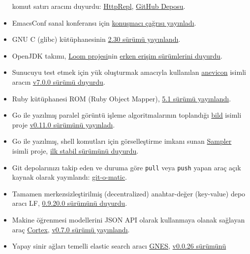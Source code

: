\documentclass[11pt]{article}
\begin{document}
\begin{itemize}
komut satırı aracını duyurdu: \href{https://devblogs.microsoft.com/aspnet/httprepl-a-command-line-tool-for-interacting-with-restful-http-services/}{HttpRepl}, \href{https://github.com/aspnet/HttpRepl}{GitHub Deposu}.
\item EmacsConf sanal konferansı için \href{https://emacsconf.org/2019/cfp}{konuşmacı çağrısı yayınladı}.
\item GNU C (glibc) kütüphanesinin \href{https://lwn.net/Articles/795127/}{2.30 sürümü yayınlandı}.
\item OpenJDK takımı, \href{https://openjdk.java.net/projects/loom/}{Loom projesi}nin \href{https://mail.openjdk.java.net/pipermail/loom-dev/2019-July/000633.html}{erken erişim sürümlerini duyurdu}.
\item Sunucuyu test etmek için yük oluşturmak amacıyla kullanılan \href{https://github.com/Gymmasssorla/anevicon}{anevicon} isimli
aracın \href{https://github.com/Gymmasssorla/anevicon/releases/tag/v7.0.0}{v7.0.0 sürümü duyurdu}.
\item Ruby kütüphanesi ROM (Ruby Object Mapper), \href{https://rom-rb.org/blog/rom-5-1-released/}{5.1 sürümü yayınlandı}.
\item Go ile yazılmış paralel görüntü işleme algoritmalarının toplandığı \href{https://github.com/anthonynsimon/bild}{bild}
isimli proje \href{https://github.com/anthonynsimon/bild/releases/tag/0.11.0}{v0.11.0 sürümünü yayınladı}.
\item Go ile yazılmış, shell komutları için görselleştirme imkanı sunan \href{https://github.com/sqshq/sampler}{Sampler}
isimli proje, \href{https://github.com/sqshq/sampler/releases/tag/v1.0.0}{ilk stabil sürümünü duyurdu}.
\item Git depolarınızı takip eden ve duruma göre \texttt{pull} veya \texttt{push} yapan araç
açık kaynak olarak yayınlandı: \href{https://github.com/muesli/gitomatic}{git-o-matic}.
\item Tamamen merkezsizleştirilmiş (decentralized) anahtar-değer (key-value) depo
aracı LF, \href{https://github.com/zerotier/lf/releases/tag/0.9.20.0}{0.9.20.0 sürümünü duyurdu}.
\item Makine öğrenmesi modellerini JSON API olarak kullanmaya olanak sağlayan araç
\href{https://cortex.dev/}{Cortex}, \href{https://github.com/cortexlabs/cortex/releases/tag/v0.7.0}{v0.7.0 sürümü yayınlandı}.
\item Yapay sinir ağları temelli elastic search aracı \href{https://github.com/gnes-ai/gnes}{GNES}, \href{https://github.com/gnes-ai/gnes/releases/tag/v0.0.26}{v0.0.26 sürümünü
}
\end{itemize}
\end{document}
